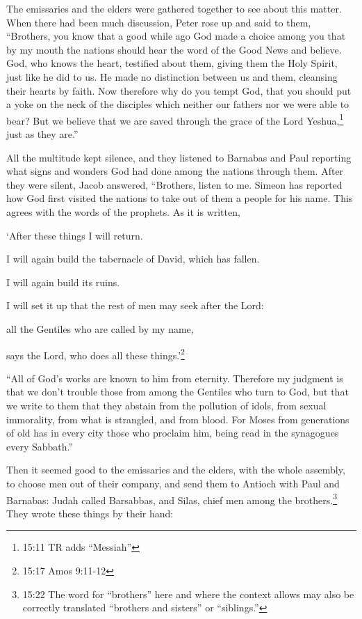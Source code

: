 \myverse{}The emissaries and the elders were gathered together to see about
this matter.
\myverse{}When there had been much discussion, Peter rose up and said to them, “Brothers,
you know that a good while ago God made a choice among you that by my mouth the nations should hear the
word of the Good News and believe.
\myverse{}God, who knows the heart, testified about them, giving them the Holy Spirit,
just like he did to us.
\myverse{}He made no distinction between us and them, cleansing their hearts by faith.
\myverse{}Now therefore why do you tempt God, that you should put a yoke on the neck
of the disciples which neither our fathers nor we were able to bear?
\myverse{}But we believe that we are saved through the grace of the Lord Yeshua,\footnote{15:11 TR adds “Messiah”} just as they are.”

\myverse{}All the multitude kept silence, and they listened to Barnabas
and Paul reporting what signs and wonders God had done among the nations through them.
\myverse{}After they were silent, Jacob answered, “Brothers, listen to me.
\myverse{}Simeon has reported how God first visited the nations to take out of them
a people for his name.
\myverse{}This agrees with the words of the prophets. As it is written,

\myverse{}‘After these things I will return.

I will again build the tabernacle of David, which has fallen.

I will again build its ruins.

I will set it up
\myverse{}that the rest of men may seek after the Lord:

all the Gentiles who are called by my name,

says the Lord, who does all these things.’\footnote{15:17 Amos 9:11-12}

\myverse{}“All of God’s works are known to him from eternity.
\myverse{}Therefore my judgment is that we don’t trouble those from among the Gentiles
who turn to God,
\myverse{}but that we write to them that they abstain from the pollution of idols,
from sexual immorality, from what is strangled, and from blood.
\myverse{}For Moses from generations of old has in every city those who proclaim him,
being read in the synagogues every Sabbath.”

\myverse{}Then it seemed good to the emissaries and the elders, with the
whole assembly, to choose men out of their company, and send them to Antioch with Paul and Barnabas: Judah
called Barsabbas, and Silas, chief men among the brothers.\footnote{15:22 The word for “brothers” here and where the context allows may also be correctly translated “brothers
	and sisters” or “siblings.”}
\myverse{}They wrote these things by their hand:

